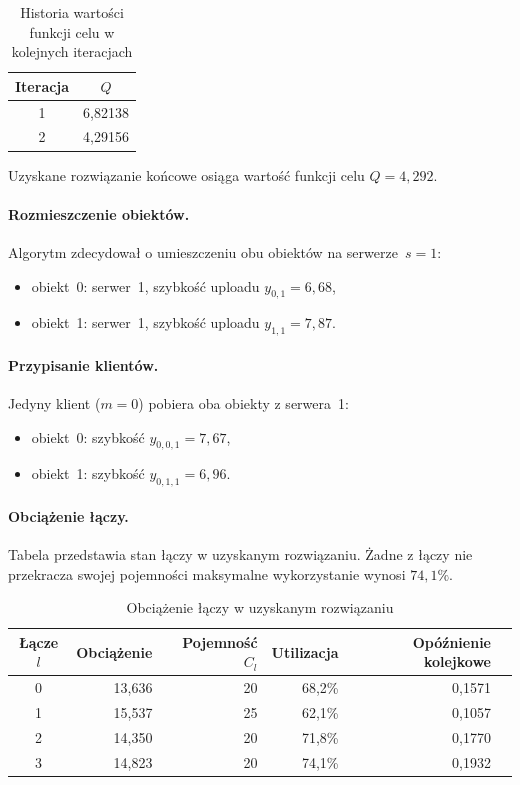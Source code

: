 \documentclass{article}
\begin{document}
\begin{table}[h]
\centering
\caption{Historia wartości funkcji celu w kolejnych iteracjach}
\label{tab:iters}
\begin{tabular}{cc}
\hline
Iteracja & $Q$ \\
\hline
1 & 6{,}82138 \\
2 & 4{,}29156 \\
\hline
\end{tabular}
\end{table}

Uzyskane rozwiązanie końcowe osiąga wartość funkcji celu $Q = 4{,}292$.

\paragraph{Rozmieszczenie obiektów.}
Algorytm zdecydował o umieszczeniu obu obiektów na serwerze~$s=1$:
\begin{itemize}
    \item obiekt~0: serwer~1, szybkość uploadu $y_{0,1} = 6{,}68$,
    \item obiekt~1: serwer~1, szybkość uploadu $y_{1,1} = 7{,}87$.
\end{itemize}

\paragraph{Przypisanie klientów.}
Jedyny klient ($m=0$) pobiera oba obiekty z serwera~1:
\begin{itemize}
    \item obiekt~0: szybkość $y_{0,0,1} = 7{,}67$,
    \item obiekt~1: szybkość $y_{0,1,1} = 6{,}96$.
\end{itemize}

\paragraph{Obciążenie łączy.}
Tabela przedstawia stan łączy w uzyskanym rozwiązaniu. 
Żadne z łączy nie przekracza swojej pojemności  maksymalne wykorzystanie wynosi $74{,}1\%$.

  \begin{table}[h]
  \centering
  \caption{Obciążenie łączy w uzyskanym rozwiązaniu}
  \label{tab:links}
  \begin{tabular}{crrrrr}
  \hline
  Łącze $l$ & Obciążenie & Pojemność $C_l$ & Utilizacja &
  Opóźnienie kolejkowe \\
  \hline
  0 & 13{,}636 & 20 & 68{,}2\% & 0{,}1571 \\
  1 & 15{,}537 & 25 & 62{,}1\% & 0{,}1057 \\
  2 & 14{,}350 & 20 & 71{,}8\% & 0{,}1770 \\
  3 & 14{,}823 & 20 & 74{,}1\% & 0{,}1932 \\
  \hline
  \end{tabular}
  \end{table}
\end{document}
